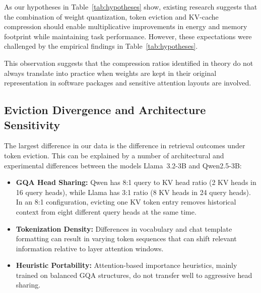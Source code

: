 \documentclass[sigconf,nonacm]{acmart}
\begin{document}
As our hypotheses in Table~\ref{tab:hypotheses} show, existing research suggests that the combination of weight quantization, token eviction and KV-cache compression should enable multiplicative improvements in energy and memory footprint while maintaining task performance. However, these expectations were challenged by the empirical findings in Table~\ref{tab:hypotheses}.



\begin{table}[htbp]
\caption{Initial Expectations versus Empirical Findings}
\label{tab:hypotheses}
\centering\small
{}
\end{table}

This observation suggests that the compression ratios identified in theory do not always translate into practice when weights are kept in their original representation in software packages and sensitive attention layouts are involved.

\subsection{Eviction Divergence and Architecture Sensitivity}

The largest difference in our data is the difference in retrieval outcomes under token eviction. This can be explained by a number of architectural and experimental differences between the models Llama~3.2-3B and Qwen2.5-3B:
\begin{itemize}
  \item \textbf{GQA Head Sharing:} Qwen has 8:1 query to KV head ratio (2 KV heads in 16 query heads), while Llama has 3:1 ratio (8 KV heads in 24 query heads). In an 8:1 configuration, evicting one KV token entry removes historical context from eight different query heads at the same time.
  \item \textbf{Tokenization Density:} Differences in vocabulary and chat template formatting can result in varying token sequences that can shift relevant information relative to layer attention windows.
 \item \textbf{Heuristic Portability:} Attention-based importance heuristics, mainly trained on balanced GQA structures, do not transfer well to aggressive head sharing.
\end{itemize}
\end{document}
